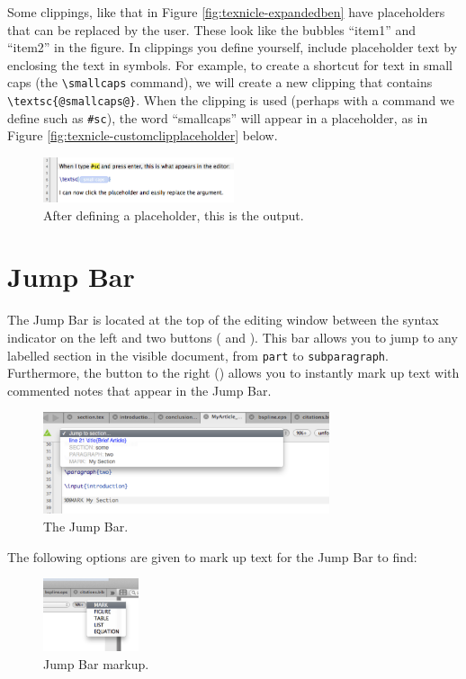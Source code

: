 Some clippings, like that in Figure \ref{fig:texnicle-expandedben} have placeholders that can be replaced by the user. These look like the bubbles ``item1'' and ``item2'' in the figure. In clippings you define yourself, include placeholder text by enclosing the text in \@ symbols. For example, to create a shortcut for text in small caps (the \verb|\smallcaps| command), we will create a new clipping that contains \verb|\textsc{@smallcaps@}|. When the clipping is used (perhaps with a command we define such as \verb|#sc|), the word ``smallcaps'' will appear in a placeholder, as in Figure \ref{fig:texnicle-customclipplaceholder} below.
\begin{figure}[htbp]
\centering
\includegraphics[width=0.5\textwidth]{TeXnicle-Images/texnicle-customcliptag.png}
\caption{After defining a placeholder, this is the output.}
\label{fig:texnicle-customcliptag}
\end{figure}

\section{Jump Bar}
\label{reference.jumpbar}
The Jump Bar is located at the top of the editing window between the syntax indicator on the left and two buttons (\keys{\%\%\ensuremath{+}} and ). This bar allows you to jump to any labelled section in the visible document, from \verb|part| to \verb|subparagraph|. Furthermore, the button to the right (\keys{\%\%\ensuremath{+}}) allows you to instantly mark up text with commented notes that appear in the Jump Bar.
\begin{figure}[htbp]
\centering
\includegraphics[width=0.75\textwidth]{TeXnicle-Images/texnicle-jumpbar.png}
\caption{The Jump Bar.}
\label{fig:texnicle-jumpbar}
\end{figure}

The following options are given to mark up text for the Jump Bar to find:
\begin{figure}[htbp]
\centering
\includegraphics[width=0.25\textwidth]{TeXnicle-Images/texnicle-markup.png}
\caption{Jump Bar markup.}
\label{fig:texnicle-markup}
\end{figure}

